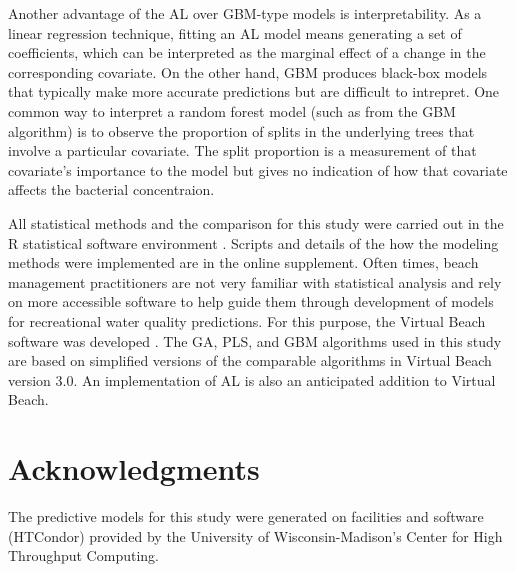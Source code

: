 \documentclass[authoryear,review, 12pt]{elsarticle}
\begin{document}
Another advantage of the AL over GBM-type models is interpretability. As
a linear regression technique, fitting an AL model means generating a
set of coefficients, which can be interpreted as the marginal effect of
a change in the corresponding covariate. On the other hand, GBM produces
black-box models that typically make more accurate predictions but are
difficult to intrepret. One common way to interpret a random forest
model (such as from the GBM algorithm) is to observe the proportion of
splits in the underlying trees that involve a particular covariate. The
split proportion is a measurement of that covariate's importance to the
model but gives no indication of how that covariate affects the
bacterial concentraion.

All statistical methods and the comparison for this study were carried
out in the R statistical software environment \citep{R-2014}. Scripts and
details of the how the modeling methods were implemented are in the
online supplement. Often times, beach management practitioners are not
very familiar with statistical analysis and rely on more accessible
software to help guide them through development of models for
recreational water quality predictions. For this purpose, the Virtual
Beach software was developed \citep{VB3-2013}. The GA, PLS, and GBM
algorithms used in this study are based on simplified versions of the
comparable algorithms in Virtual Beach version 3.0. An implementation of
AL is also an anticipated addition to Virtual Beach.

\section{Acknowledgments}\label{acknowledgments}

The predictive models for this study were generated on facilities and
software (HTCondor) provided by the University of Wisconsin-Madison's
Center for High Throughput Computing.
\end{document}
